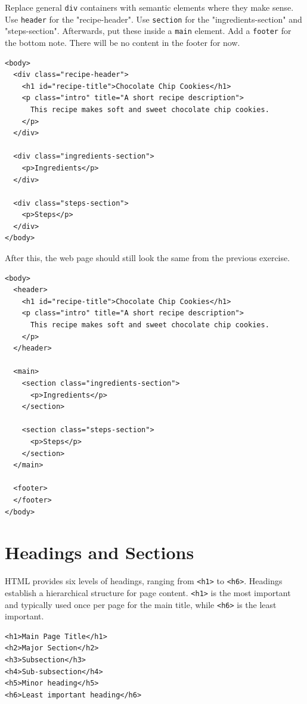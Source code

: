 \begin{Exercise}[label=html-semantic1, title=Using Semantic Elements]
Replace general \texttt{div} containers with semantic elements where they make sense. 
Use \texttt{header} for the "recipe-header".
Use \texttt{section} for the "ingredients-section" and "steps-section". Afterwards, put these inside a \texttt{main} element.
Add a \texttt{footer} for the bottom note. There will be no content in the footer for now.

\begin{verbatim}
<body>
  <div class="recipe-header">
    <h1 id="recipe-title">Chocolate Chip Cookies</h1>
    <p class="intro" title="A short recipe description">
      This recipe makes soft and sweet chocolate chip cookies.
    </p>
  </div>

  <div class="ingredients-section">
    <p>Ingredients</p>
  </div>

  <div class="steps-section">
    <p>Steps</p>
  </div>
</body>
\end{verbatim}
\end{Exercise}
After this, the web page should still look the same from the previous exercise.

\begin{Answer}[ref=html-semantic1]
\begin{verbatim}
<body>
  <header>
    <h1 id="recipe-title">Chocolate Chip Cookies</h1>
    <p class="intro" title="A short recipe description">
      This recipe makes soft and sweet chocolate chip cookies.
    </p>
  </header>

  <main>
    <section class="ingredients-section">
      <p>Ingredients</p>
    </section>

    <section class="steps-section">
      <p>Steps</p>
    </section>
  </main>

  <footer>
  </footer>
</body>
\end{verbatim}
\end{Answer}

\section{Headings and Sections}
HTML provides six levels of headings, ranging from \verb|<h1>| to \verb|<h6>|.
Headings establish a hierarchical structure for page content. \verb|<h1>| is the
most important and typically used once per page for the main title, while \verb|<h6>|
is the least important.

\begin{verbatim}
<h1>Main Page Title</h1>
<h2>Major Section</h2>
<h3>Subsection</h3>
<h4>Sub-subsection</h4>
<h5>Minor heading</h5>
<h6>Least important heading</h6>
\end{verbatim}

